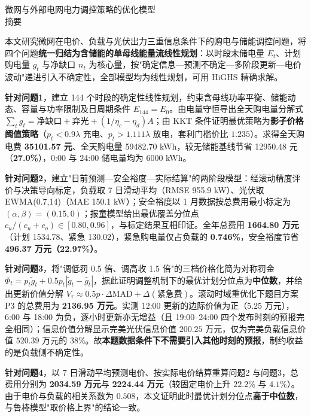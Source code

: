 \begin{center}
  {\heiti{} 微网与外部电网电力调控策略的优化模型}\\[6pt]
  {\heiti{} 摘\quad 要}
\end{center}

\begingroup
{}

本文研究微网在电价、负载与光伏出力三重信息条件下的购电与储能调控问题，将四个问题\textbf{统一归结为含储能的单母线能量流线性规划}：以时段末储电量 $E_t$、计划购电量 $g_t$ 与净缺口 $n_t$ 为核心量，按"确定信息—预测不确定—多阶段更新—电价波动"递进引入不确定性，全部模型均为线性规划，可用 HiGHS 精确求解。

\textbf{针对问题1}，建立 144 个时段的确定性线性规划，约束含母线功率平衡、储能动态、容量与功率限制及日周期条件 $E_{144}=E_0$。由电量守恒导出全天购电量分解式 $\sum_tg_t=\text{净缺口}+\text{弃光}+(1/\eta_c-\eta_d)A$；由 KKT 条件证明最优策略为\textbf{影子价格阈值策略}（$p_t<0.9\lambda$ 充电、$p_t>1.111\lambda$ 放电，套利门槛价比 $1.235$）。求得全天购电费 \textbf{35101.57 元}、全天购电量 59482.70 \si{kWh}，较无储能基线节省 12950.48 元（\textbf{27.0\%}），0:00 与 24:00 储电量均为 6000 \si{kWh}。

\textbf{针对问题2}，建立"日前预测—安全裕度—实际结算"的两阶段模型：经滚动精度评价与决策导向标定，负载取 7 日滑动平均（RMSE 955.9 \si{kW}）、光伏取 EWMA(0.7,14)（MAE 150.1 \si{kW}）；安全裕度以 1 月数据按总费用最小标定为 $(\alpha,\beta)=(0.15,0)$；报童模型给出最优覆盖分位点 $c_u/(c_u+c_o)\in[0.80,0.96]$，与标定结果互相印证。全年总费用 \textbf{1664.80 万元}（计划 1534.78、紧急 130.02），紧急购电量仅占负载的 \textbf{0.746\%}，安全裕度节省 \textbf{496.37 万元（22.97\%）}。

\textbf{针对问题3}，将"调低罚 0.5 倍、调高收 1.5 倍"的三档价格化简为对称罚金 $\Phi_t=p_t\tilde g_t+0.5p_t|\tilde g_t-\hat g_t|$，据此证明调整机制下的最优计划分位点为\textbf{中位数}，并给出更新价值分解 $V_\tau\approx0.5p\cdot\Delta\mathrm{MAD}+\Delta(\text{紧急费})$。滚动时域重优化下题目方案 P3 的总费用为 \textbf{2136.95 万元}。实测 12:00 更新的边际价值为正（$5.25$ 万元），6:00 与 18:00 为负，逐小时更新亦无增益（且 19:00--24:00 四个发布时刻的预报完全相同）；信息价值分解显示完美光伏信息价值 $200.25$ 万元，仅为完美负载信息价值 $520.39$ 万元的 $38\%$。故\textbf{本题数据条件下不需要引入其他时刻的预报}，制约收益的是负载侧不确定性。

\textbf{针对问题4}，以 7 日滑动平均预测电价、按实际电价结算重算问题2 与问题3，总费用分别为 \textbf{2034.59 万元}与 \textbf{2224.44 万元}（较固定电价上升 $22.2\%$ 与 $4.1\%$）。由于电价与负载的相关系数为 $0.508$，本文证明此时最优计划分位点\textbf{高于中位数}，与鲁棒模型"取价格上界"的结论一致。

